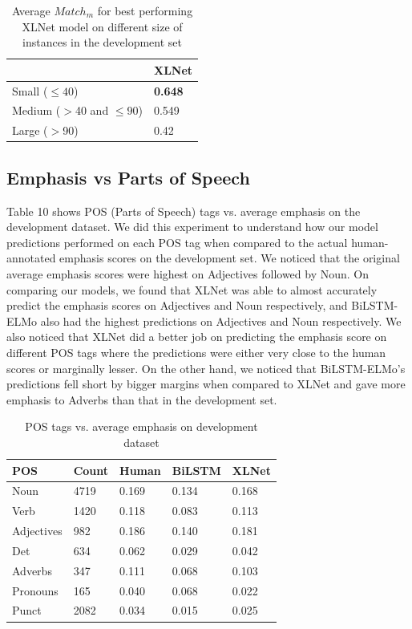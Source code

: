 \documentclass[letterpaper]{article} %
\begin{document}
\begin{table}[h!]
\centering
\begin{tabular}{|l|l|}
\hline
& \textbf{XLNet} \\
\hline
Small ($\leq40$) & \textbf{0.648}  \\
\hline
Medium ($>$40 and $\leq90$) & 0.549 \\
\hline
Large ($>$90) & 0.42 \\
\hline
\end{tabular}
\caption{Average $Match_m$ for best performing XLNet model on different size of instances in the development set}
\label{table:8}
\end{table}

\subsection{Emphasis vs Parts of Speech}
Table 10 shows POS (Parts of Speech) tags vs. average emphasis on the development dataset. We did this experiment to understand how our model predictions performed on each POS tag when compared to the actual human-annotated emphasis scores on the development set. We noticed that the original average emphasis scores were highest on Adjectives followed by Noun. On comparing our models, we found that XLNet was able to almost accurately predict the emphasis scores on Adjectives and Noun respectively, and BiLSTM-ELMo also had the highest predictions on Adjectives and Noun respectively. We also noticed that XLNet did a better job on predicting the emphasis score on different POS tags where the predictions were either very close to the human scores or marginally lesser. On the other hand, we noticed that BiLSTM-ELMo's predictions fell short by bigger margins when compared to XLNet and gave more emphasis to Adverbs than that in the development set.

\begin{table}[h!]
\centering
\begin{tabular}{|l|l|l|l|l|}
\hline
\textbf{POS} & \textbf{Count} & \textbf{Human} & \textbf{BiLSTM} & \textbf{XLNet} \\
\hline
Noun & 4719 & 0.169 & 0.134 & 0.168 \\
\hline
Verb & 1420 & 0.118 & 0.083 & 0.113 \\
\hline
Adjectives & 982 & 0.186 & 0.140 & 0.181 \\
\hline
Det & 634 & 0.062 & 0.029 & 0.042 \\
\hline
Adverbs & 347 & 0.111 & 0.068 & 0.103 \\
\hline
Pronouns & 165 & 0.040 & 0.068 & 0.022 \\
\hline
Punct & 2082 & 0.034 & 0.015 & 0.025 \\
\hline
\end{tabular}
\caption{POS tags vs. average emphasis on development dataset}
\label{table:9}
\end{table}
\end{document}
